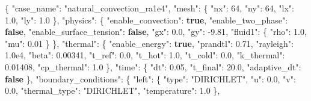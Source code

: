 \documentclass[
  french,
]{article}
\newenvironment{Shaded}{}{}
\newcommand{\DataTypeTok}[1]{\textcolor[rgb]{0.56,0.13,0.00}{#1}}
\newcommand{\DecValTok}[1]{\textcolor[rgb]{0.25,0.63,0.44}{#1}}
\newcommand{\FloatTok}[1]{\textcolor[rgb]{0.25,0.63,0.44}{#1}}
\newcommand{\FunctionTok}[1]{\textcolor[rgb]{0.02,0.16,0.49}{#1}}
\newcommand{\KeywordTok}[1]{\textcolor[rgb]{0.00,0.44,0.13}{\textbf{#1}}}
\newcommand{\StringTok}[1]{\textcolor[rgb]{0.25,0.44,0.63}{#1}}
\begin{document}
\begin{Shaded}
\begin{Highlighting}[]
\FunctionTok{\{}
  \DataTypeTok{"case\_name"}\FunctionTok{:} \StringTok{"natural\_convection\_ra1e4"}\FunctionTok{,}
  \DataTypeTok{"mesh"}\FunctionTok{:} \FunctionTok{\{} \DataTypeTok{"nx"}\FunctionTok{:} \DecValTok{64}\FunctionTok{,} \DataTypeTok{"ny"}\FunctionTok{:} \DecValTok{64}\FunctionTok{,} \DataTypeTok{"lx"}\FunctionTok{:} \FloatTok{1.0}\FunctionTok{,} \DataTypeTok{"ly"}\FunctionTok{:} \FloatTok{1.0} \FunctionTok{\},}
  \DataTypeTok{"physics"}\FunctionTok{:} \FunctionTok{\{}
    \DataTypeTok{"enable\_convection"}\FunctionTok{:} \KeywordTok{true}\FunctionTok{,}
    \DataTypeTok{"enable\_two\_phase"}\FunctionTok{:} \KeywordTok{false}\FunctionTok{,}
    \DataTypeTok{"enable\_surface\_tension"}\FunctionTok{:} \KeywordTok{false}\FunctionTok{,}
    \DataTypeTok{"gx"}\FunctionTok{:} \FloatTok{0.0}\FunctionTok{,} \DataTypeTok{"gy"}\FunctionTok{:} \FloatTok{{-}9.81}\FunctionTok{,}
    \DataTypeTok{"fluid1"}\FunctionTok{:} \FunctionTok{\{} \DataTypeTok{"rho"}\FunctionTok{:} \FloatTok{1.0}\FunctionTok{,} \DataTypeTok{"mu"}\FunctionTok{:} \FloatTok{0.01} \FunctionTok{\}}
  \FunctionTok{\},}
  \DataTypeTok{"thermal"}\FunctionTok{:} \FunctionTok{\{}
    \DataTypeTok{"enable\_energy"}\FunctionTok{:} \KeywordTok{true}\FunctionTok{,}
    \DataTypeTok{"prandtl"}\FunctionTok{:} \FloatTok{0.71}\FunctionTok{,}
    \DataTypeTok{"rayleigh"}\FunctionTok{:} \FloatTok{1.0e4}\FunctionTok{,}
    \DataTypeTok{"beta"}\FunctionTok{:} \FloatTok{0.00341}\FunctionTok{,}
    \DataTypeTok{"t\_ref"}\FunctionTok{:} \FloatTok{0.0}\FunctionTok{,}
    \DataTypeTok{"t\_hot"}\FunctionTok{:} \FloatTok{1.0}\FunctionTok{,}
    \DataTypeTok{"t\_cold"}\FunctionTok{:} \FloatTok{0.0}\FunctionTok{,}
    \DataTypeTok{"k\_thermal"}\FunctionTok{:} \FloatTok{0.01408}\FunctionTok{,}
    \DataTypeTok{"cp\_thermal"}\FunctionTok{:} \FloatTok{1.0}
  \FunctionTok{\},}
  \DataTypeTok{"time"}\FunctionTok{:} \FunctionTok{\{} \DataTypeTok{"dt"}\FunctionTok{:} \FloatTok{0.05}\FunctionTok{,} \DataTypeTok{"t\_final"}\FunctionTok{:} \FloatTok{20.0}\FunctionTok{,} \DataTypeTok{"adaptive\_dt"}\FunctionTok{:} \KeywordTok{false} \FunctionTok{\},}
  \DataTypeTok{"boundary\_conditions"}\FunctionTok{:} \FunctionTok{\{}
    \DataTypeTok{"left"}\FunctionTok{:}   \FunctionTok{\{} \DataTypeTok{"type"}\FunctionTok{:} \StringTok{"DIRICHLET"}\FunctionTok{,} \DataTypeTok{"u"}\FunctionTok{:} \FloatTok{0.0}\FunctionTok{,} \DataTypeTok{"v"}\FunctionTok{:} \FloatTok{0.0}\FunctionTok{,} \DataTypeTok{"thermal\_type"}\FunctionTok{:} \StringTok{"DIRICHLET"}\FunctionTok{,} \DataTypeTok{"temperature"}\FunctionTok{:} \FloatTok{1.0} \FunctionTok{\},}

\end{Highlighting}
\end{Shaded}
\end{document}
